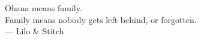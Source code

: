 \chapter*{}
\vfill
\begin{flushright}
  Ohana means family.\\
Family means nobody gets left behind, or forgotten.\\
— Lilo \& Stitch

\end{flushright}
